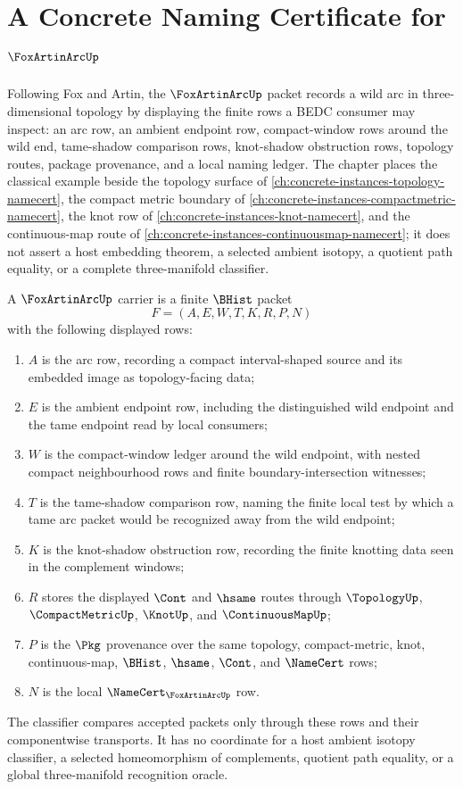 \chapter{A Concrete Naming Certificate for $\FoxArtinArcUp$}
\label{ch:concrete-instances-fox-artin-arc-namecert}

Following Fox and Artin, the $\FoxArtinArcUp$ packet records a wild arc in three-dimensional topology by displaying the finite rows a BEDC consumer may inspect: an arc row, an ambient endpoint row, compact-window rows around the wild end, tame-shadow comparison rows, knot-shadow obstruction rows, topology routes, package provenance, and a local naming ledger. The chapter places the classical example beside the topology surface of \autoref{ch:concrete-instances-topology-namecert}, the compact metric boundary of \autoref{ch:concrete-instances-compactmetric-namecert}, the knot row of \autoref{ch:concrete-instances-knot-namecert}, and the continuous-map route of \autoref{ch:concrete-instances-continuousmap-namecert}; it does not assert a host embedding theorem, a selected ambient isotopy, a quotient path equality, or a complete three-manifold classifier.

\begin{definition}
\label{def:fox-artin-arc-carrier}
A $\FoxArtinArcUp$ carrier is a finite $\BHist$ packet
$$
F=(A,E,W,T,K,R,P,N)
$$
with the following displayed rows:
\begin{enumerate}
\item $A$ is the arc row, recording a compact interval-shaped source and its embedded image as topology-facing data;
\item $E$ is the ambient endpoint row, including the distinguished wild endpoint and the tame endpoint read by local consumers;
\item $W$ is the compact-window ledger around the wild endpoint, with nested compact neighbourhood rows and finite boundary-intersection witnesses;
\item $T$ is the tame-shadow comparison row, naming the finite local test by which a tame arc packet would be recognized away from the wild endpoint;
\item $K$ is the knot-shadow obstruction row, recording the finite knotting data seen in the complement windows;
\item $R$ stores the displayed $\Cont$ and $\hsame$ routes through $\TopologyUp$, $\CompactMetricUp$, $\KnotUp$, and $\ContinuousMapUp$;
\item $P$ is the $\Pkg$ provenance over the same topology, compact-metric, knot, continuous-map, $\BHist$, $\hsame$, $\Cont$, and $\NameCert$ rows;
\item $N$ is the local $\NameCert_{\FoxArtinArcUp}$ row.
\end{enumerate}
The classifier compares accepted packets only through these rows and their componentwise transports. It has no coordinate for a host ambient isotopy classifier, a selected homeomorphism of complements, quotient path equality, or a global three-manifold recognition oracle.
\end{definition}

